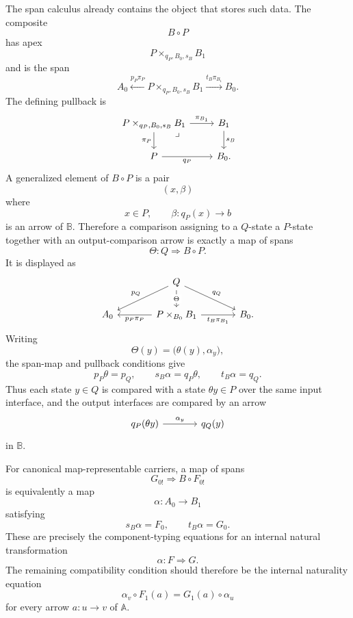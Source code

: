 The span calculus already contains the object that stores such data. The composite
\[
    B\circ P
\]
has apex
\[
    P\times_{q_P,B_0,s_B}B_1
\]
and is the span
\[
    A_0
    \xleftarrow{p_P\pi_P}
    P\times_{q_P,B_0,s_B}B_1
    \xrightarrow{t_B\pi_{B_1}}
    B_0.
\]
The defining pullback is
\[
    \begin{tikzcd}
        P\times_{q_P,B_0,s_B}B_1
            \arrow[r, "\pi_{B_1}"]
            \arrow[d, "\pi_P"']
            \arrow[dr, phantom, "\lrcorner", very near start]
        &
            B_1
                \arrow[d, "s_B"]
        \\
            P
                \arrow[r, "q_P"']
        &
            B_0.
    \end{tikzcd}
\]
A generalized element of \(B\circ P\) is a pair
\[
    (x,\beta)
\]
where
\[
    x\in P,
    \qquad
    \beta:q_P(x)\to b
\]
is an arrow of \(\mathbb B\). Therefore a comparison assigning to a \(Q\)-state a \(P\)-state together with an output-comparison arrow is exactly a map of spans
\[
    \Theta:Q\Rightarrow B\circ P.
\]
It is displayed as
\[
    \begin{tikzcd}[column sep=large]
        &
            Q
                \arrow[d, "\Theta" description]
                \arrow[dl, "p_Q"']
                \arrow[dr, "q_Q"]
        &
        \\
            A_0
        &
            P\times_{B_0}B_1
                \arrow[l, "p_P\pi_P"]
                \arrow[r, "t_B\pi_{B_1}"']
        &
            B_0.
    \end{tikzcd}
\]
Writing
\[
    \Theta(y)=\bigl(\theta(y),\alpha_y\bigr),
\]
the span-map and pullback conditions give
\[
    p_P\theta=p_Q,
    \qquad
    s_B\alpha=q_P\theta,
    \qquad
    t_B\alpha=q_Q.
\]
Thus each state \(y\in Q\) is compared with a state \(\theta y\in P\) over the same input interface, and the output interfaces are compared by an arrow
\[
    \begin{tikzcd}[column sep=large]
            q_P(\theta y)
                \arrow[r, "\alpha_y"]
        &
            q_Q(y)
    \end{tikzcd}
\]
in \(\mathbb B\).

For canonical map-representable carriers, a map of spans
\[
    G_{0!}\Rightarrow B\circ F_{0!}
\]
is equivalently a map
\[
    \alpha:A_0\to B_1
\]
satisfying
\[
    s_B\alpha=F_0,
    \qquad
    t_B\alpha=G_0.
\]
These are precisely the component-typing equations for an internal natural transformation
\[
    \alpha:F\Rightarrow G.
\]
The remaining compatibility condition should therefore be the internal naturality equation
\[
    \alpha_v\circ F_1(a)=G_1(a)\circ\alpha_u
\]
for every arrow \(a:u\to v\) of \(\mathbb A\).

